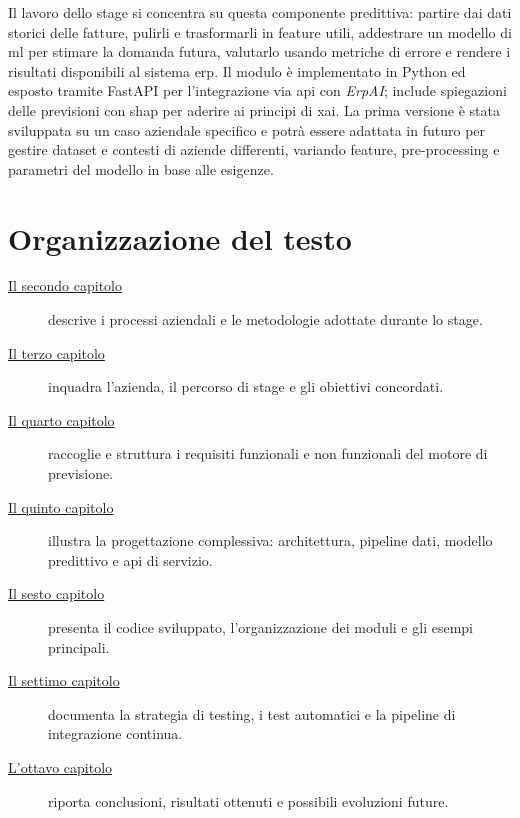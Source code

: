 Il lavoro dello stage si concentra su questa componente predittiva: partire dai dati storici delle fatture, pulirli e trasformarli in feature utili, addestrare un modello di \gls{ml} per stimare la domanda futura, valutarlo usando metriche di errore e rendere i risultati disponibili al sistema \acrshort{erp}. Il modulo è implementato in Python ed esposto tramite FastAPI per l’integrazione via \gls{api} con \textit{ErpAI}; include spiegazioni delle previsioni con \gls{shap} per aderire ai principi di \acrfull{xai}. La prima versione è stata sviluppata su un caso aziendale specifico e potrà essere adattata in futuro per gestire dataset e contesti di aziende differenti, variando feature, pre-processing e parametri del modello in base alle esigenze.

\section{Organizzazione del testo}
\begin{description}
    \item[{\hyperref[chap:processi-metodologie]{Il secondo capitolo}}] descrive i processi aziendali e le metodologie adottate durante lo stage.
    \item[{\hyperref[chap:descrizione-stage]{Il terzo capitolo}}] inquadra l’azienda, il percorso di stage e gli obiettivi concordati.
    \item[{\hyperref[chap:analisi-requisiti]{Il quarto capitolo}}] raccoglie e struttura i requisiti funzionali e non funzionali del motore di previsione.
    \item[{\hyperref[chap:design]{Il quinto capitolo}}] illustra la progettazione complessiva: architettura, pipeline dati, modello predittivo e \gls{api} di servizio.
    \item[{\hyperref[chap:codebase]{Il sesto capitolo}}] presenta il codice sviluppato, l’organizzazione dei moduli e gli esempi principali.
    \item[{\hyperref[chap:testing]{Il settimo capitolo}}] documenta la strategia di testing, i test automatici e la pipeline di integrazione continua.
    \item[{\hyperref[chap:conclusioni]{L’ottavo capitolo}}] riporta conclusioni, risultati ottenuti e possibili evoluzioni future.
\end{description}

